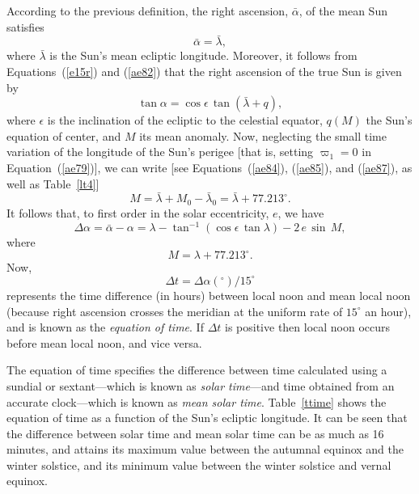 According to the previous definition, the right ascension, $\bar{\alpha}$, of the mean
Sun satisfies
\begin{equation}
\bar{\alpha} = \bar{\lambda},
\end{equation}
where $\bar{\lambda}$ is the Sun's mean ecliptic longitude. Moreover,
it follows from Equations~(\ref{e15r})  and (\ref{ae82}) that the right ascension
of the true Sun is given by
\begin{equation}
\tan\alpha = \cos\epsilon\,\tan(\bar{\lambda}+q),
\end{equation}
where $\epsilon$ is the inclination of the ecliptic to the celestial
equator, $q(M)$  the Sun's equation of center, and $M$ its mean anomaly. Now, neglecting the small time variation of the longitude of the
Sun's perigee [that is, setting $\varpi_1=0$ in Equation~(\ref{ae79})], we 
can write [see Equations~(\ref{ae84}), (\ref{ae85}), and (\ref{ae87}), as
well as Table~\ref{lt4}]
\begin{equation}
M = \bar{\lambda} + M_0-\bar{\lambda}_0 = \bar{\lambda} +77.213^\circ.
\end{equation}
It follows that, to first order in the solar eccentricity, $e$, we have
\begin{equation}
\Delta\alpha = \bar{\alpha}-\alpha = \lambda - \tan^{-1}(\cos \epsilon\,\tan\lambda) - 2\,e\,\sin\,M,
\end{equation}
where
\begin{equation}
M = \lambda + 77.213^\circ.
\end{equation}
Now,
\begin{equation}
\Delta t = \Delta\alpha(^\circ)/15^\circ
\end{equation}
represents the time difference (in hours) between local noon and mean local noon (because
right ascension crosses the meridian at the uniform rate of $15^\circ$ an
hour), and  is known as the {\em equation of time}. If $\Delta t$ is
positive then local noon occurs before mean local noon, and  vice
versa. 

The equation of time specifies the difference between  time calculated using a sundial or sextant---which is known as
{\em solar time}---and
time obtained from  an accurate clock---which is known as {\em mean solar time}. Table~\ref{ttime} shows the equation of time as a function of the Sun's
ecliptic longitude. It can be seen that the difference between solar time and mean solar time can be as much as
16 minutes, and attains its maximum value between the autumnal equinox and the winter solstice, and its
minimum value between the winter solstice and vernal equinox.

